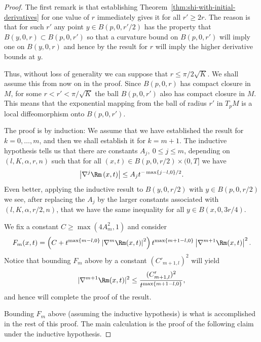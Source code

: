 \begin{proof}
The first remark is that establishing Theorem~\ref{thm:shi-with-initial-derivatives} for
one value of $r$ immediately gives it for all $r'\ge 2r$. The reason
is that for such $r'$ any point  $y\in B(p,0,r'/2)$ has the property
that $B(y,0,r)\subset B(p,0,r')$ so that a curvature bound on
$B(p,0,r')$ will imply one on $B(y,0,r)$ and hence by the result for
$r$ will imply the higher derivative bounds at $y$.


 Thus, without loss of
generality we can suppose that $r\le \pi/2\sqrt{K}$. We shall assume this
from now on in the proof. Since
$B(p,0,r)$ has compact closure in $M$, for some $r<r'<\pi/\sqrt{K}$
the ball $B(p,0,r')$ also has compact closure in $M$. This means
that the exponential mapping from the ball of radius $r'$ in $T_pM$
is a local diffeomorphism onto $B(p,0,r')$.

The proof is by induction: We assume that we have established the
result for $k=0,\ldots,m$, and then we shall establish it for
$k=m+1$. The inductive hypothesis tells us that there are constants
$A_j,\ 0\le j\le m$, depending on $(l,K,\alpha,r,n)$ such that for
all $(x,t)\in B(p,0,r/2)\times (0,T]$ we have
\begin{equation}\label{strongineq}
\left\vert \nabla^{j}\Rm \left(  x,t\right)
\right\vert \leq A_{j}t^{-\max\left\{  j-l,0\right\}  /2}.
\end{equation}
 Even better, applying the inductive result to $B(y,0,r/2)$ with
$y\in B(p,0,r/2)$ we see, after replacing the $A_j$ by the
larger constants associated with $(l,K,\alpha,r/2,n)$, that we have
the same inequality for all $y\in B(x,0,3r/4)$.


We fix a constant $C\geq \max(4A^2_m,1)$ and consider
\[
F_{m}(x,t)=\left(  C+t^{\max\left\{ m-l,0\right\} }  \left\vert \nabla
^{m}\Rm(x,t)\right\vert ^{2}\right)  t^{\max\left\{
m+1-l,0\right\}  }\left\vert
\nabla^{m+1}\Rm(x,t)\right\vert ^{2}.
\]
Notice that bounding $F_m$ above by a constant $(C'_{m+1,l})^2$ will
yield
$$|\nabla^{m+1}\Rm(x,t)|^2\le \frac{(C'_{m+1,l})^2}{t^{\max\{m+1-l,0\}}},$$
and hence will complete the proof of the result.

 Bounding $F_m$
above (assuming the inductive hypothesis) is what is accomplished in
the rest of this proof. The main calculation is the proof of the
following claim under the inductive hypothesis.


\end{proof}

